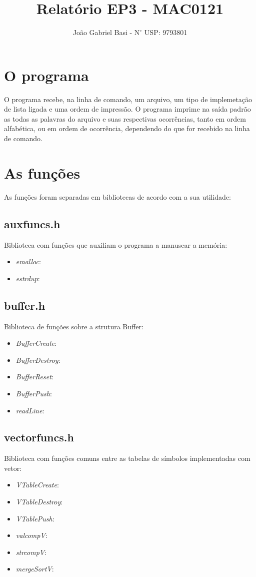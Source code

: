 \documentclass[12pt, a4paper]{article} %
\title{Relatório EP3 - MAC0121}
\date{}
\author{João Gabriel Basi - $\text{N}^\circ$ USP: 9793801}
\begin{document}
\maketitle
\section{O programa}
O programa recebe, na linha de comando, um arquivo, um tipo de implemetação de lista ligada e uma ordem de impressão. O programa imprime na saída padrão as todas as palavras do arquivo e suas respectivas ocorrências, tanto em ordem alfabética, ou em ordem de ocorrência, dependendo do que for recebido na linha de comando.

\section{As funções}
As funções foram separadas em bibliotecas de acordo com a sua utilidade:
	\subsection{auxfuncs.h}
		Biblioteca com funções que auxiliam o programa a manusear a memória:
		\begin{itemize}
			\item \textit{emalloc}:
			\item \textit{estrdup}:
		\end{itemize}
	\subsection{buffer.h}
		Biblioteca de funções sobre a strutura Buffer:
		\begin{itemize}
			\item \textit{BufferCreate}:
			\item \textit{BufferDestroy}:
			\item \textit{BufferReset}:
			\item \textit{BufferPush}:
			\item \textit{readLine}:
		\end{itemize}
	\subsection{vectorfuncs.h}
		Biblioteca com funções comuns entre as tabelas de símbolos implementadas com 		vetor:
		\begin{itemize}
			\item \textit{VTableCreate}: 
			\item \textit{VTableDestroy}:
			\item \textit{VTablePush}:
			\item \textit{valcompV}:
			\item \textit{strcompV}:
			\item \textit{mergeSortV}:
		\end{itemize}
\end{document}
